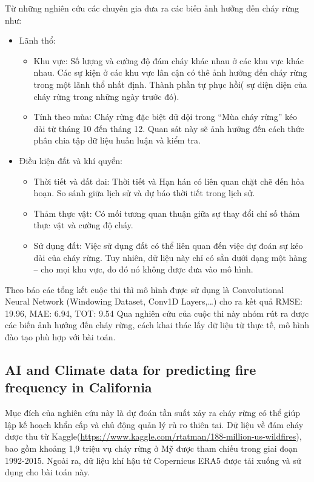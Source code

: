\documentclass{article}
\begin{document}
Từ những nghiên cứu các chuyên gia đưa ra các biến ảnh hưởng đến cháy rừng như:
\begin{itemize}
	\item Lãnh thổ:
	      \begin{itemize}
		      \item Khu vực: Số lượng và cường độ đám cháy khác nhau ở các khu vực khác nhau. Các sự kiện ở các khu vực lân cận có thê ảnh hưởng đến cháy rừng trong một lãnh thổ nhất định. Thành phần tự phục hồi( sự diện diện của cháy rừng trong những ngày trước đó).
		      \item Tính theo mùa: Cháy rừng đặc biệt dữ dội trong “Mùa cháy rừng” kéo dài từ tháng 10 đến tháng 12. Quan sát này sẽ ảnh hưởng đến cách thức phân chia tập dữ liệu huấn luận và kiểm tra.
	      \end{itemize}
	\item Điều kiện đất và khí quyển:
	      \begin{itemize}
		      \item Thời tiết và đất đai: Thời tiết và Hạn hán có liên quan chặt chẽ đến hỏa hoạn. So sánh giữa lịch sử và dự báo thời tiết trong lịch sử.
		      \item Thảm thực vật: Có mối tương quan thuận giữa sự thay đổi chỉ số thảm thực vật và cường độ cháy.
		      \item Sử dụng đất: Việc sử dụng đất có thể liên quan đến việc dự đoán sự kéo dài của cháy rừng. Tuy nhiên, dữ liệu này chỉ có sẳn dưới dạng một hàng – cho mọi khu vực, do đó nó không được đưa vào mô hình.
	      \end{itemize}
\end{itemize}
Theo báo các tổng kết cuộc thi thì mô hình được sử dụng là Convolutional Neural Network (Windowing Dataset, Conv1D Layers,…) cho ra kết quả RMSE: 19.96, MAE: 6.94, TOT: 9.54
Qua nghiên cứu của cuộc thi này nhóm rút ra được các biến ảnh hưởng đến cháy rừng, cách khai thác lấy dữ liệu từ thực tế, mô hình đào tạo phù hợp với bài toán.
\subsection{AI and Climate data for predicting fire frequency in California \cite{website:linkedin_california}}
Mục đích của nghiên cứu này là dự đoán tần suất xảy ra cháy rừng có thể giúp lập kế hoạch khẩn cấp và chủ động quản lý rủ ro thiên tai.
Dữ liệu về đám cháy được thu từ Kaggle(\url{https://www.kaggle.com/rtatman/188-million-us-wildfires}), bao gồm khoảng 1,9 triệu vụ cháy rừng ở Mỹ được tham chiếu trong giai đoạn 1992-2015. Ngoài ra, dữ liệu khí hậu từ Copernicus ERA5 được tải xuống và sử dụng cho bài toán này.
\end{document}
